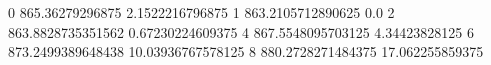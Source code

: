 0 865.36279296875 2.1522216796875
1 863.2105712890625 0.0
2 863.8828735351562 0.67230224609375
4 867.5548095703125 4.34423828125
6 873.2499389648438 10.03936767578125
8 880.2728271484375 17.062255859375
